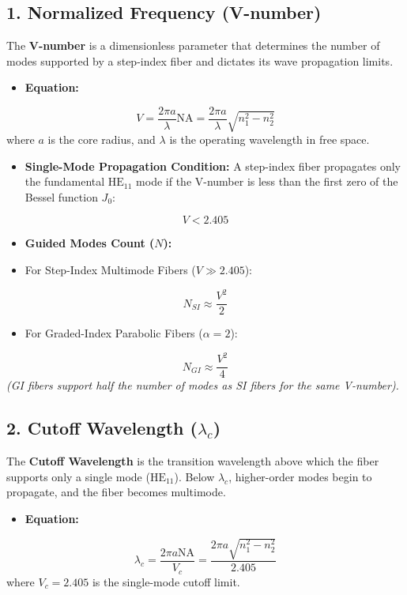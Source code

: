 \subsection{1. Normalized Frequency (V-number)}
The \textbf{V-number} is a dimensionless parameter that determines the number of modes supported by a step-index fiber and dictates its wave propagation limits.
\begin{itemize}
  \item   \textbf{Equation:}
\end{itemize}
    \[ V = \frac{2\pi a}{\lambda} \text{NA} = \frac{2\pi a}{\lambda} \sqrt{n_1^2 - n_2^2} \]
    where $a$ is the core radius, and $\lambda$ is the operating wavelength in free space.
\begin{itemize}
  \item   \textbf{Single-Mode Propagation Condition:} A step-index fiber propagates only the fundamental $\text{HE}_{11}$ mode if the V-number is less than the first zero of the Bessel function $J_0$:
\end{itemize}
    \[ V < 2.405 \]
\begin{itemize}
  \item   \textbf{Guided Modes Count ($N$):}
  \item   For Step-Index Multimode Fibers ($V \gg 2.405$):
\end{itemize}
        \[ N_{SI} \approx \frac{V^2}{2} \]
\begin{itemize}
  \item   For Graded-Index Parabolic Fibers ($\alpha = 2$):
\end{itemize}
        \[ N_{GI} \approx \frac{V^2}{4} \]
        \textit{(GI fibers support half the number of modes as SI fibers for the same V-number).}


\subsection{2. Cutoff Wavelength ($\lambda_c$)}
The \textbf{Cutoff Wavelength} is the transition wavelength above which the fiber supports only a single mode ($\text{HE}_{11}$). Below $\lambda_c$, higher-order modes begin to propagate, and the fiber becomes multimode.
\begin{itemize}
  \item   \textbf{Equation:}
\end{itemize}
    \[ \lambda_c = \frac{2\pi a \text{NA}}{V_c} = \frac{2\pi a \sqrt{n_1^2 - n_2^2}}{2.405} \]
    where $V_c = 2.405$ is the single-mode cutoff limit.


